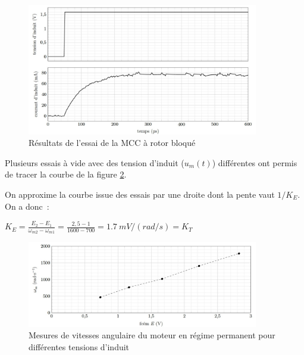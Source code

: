 \begin{figure}[!htb]
\begin{center}
\includegraphics[width=0.9\textwidth]{images/image_fig9.jpg}
\caption{Résultats de l’essai de la MCC à rotor bloqué \label{fig9}}
\end{center}
\end{figure}


Plusieurs essais à vide avec des tension d'induit ($u_m(t)$) différentes ont permis de tracer la courbe de la
figure \ref{fig12}.

\ifprof
\begin{corrige}
On approxime la courbe issue des essais par une droite dont la pente
  vaut \(1/K_{E}\). On a donc~:


\(K_{E} = \frac{E_{2} - E_{1}}{\omega_{m2} - \omega_{m1}} = \frac{2,5 - 1}{1600 - 700} = \SI{1,7}{mV/(rad/s)}=K_T\)
\end{corrige}
\else
\fi


\begin{figure}[!htb]
\begin{center}
\includegraphics[width=0.9\textwidth]{images/image_fig12.jpg}
\caption{Mesures de vitesses angulaire du moteur en régime permanent pour différentes tensions d’induit \label{fig12}}
\end{center}
\end{figure}

